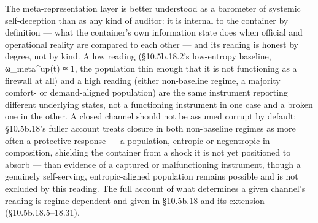 \documentclass[
]{article}
\begin{document}
The meta-representation layer is better understood as a barometer of
systemic self-deception than as any kind of auditor: it is internal to
the container by definition --- what the container's own information
state does when official and operational reality are compared to each
other --- and its reading is honest by degree, not by kind. A low
reading (§10.5b.18.2's low-entropy baseline, ω\_meta\^{}up(t) ≈ 1, the
population thin enough that it is not functioning as a firewall at all)
and a high reading (either non-baseline regime, a majority comfort- or
demand-aligned population) are the same instrument reporting different
underlying states, not a functioning instrument in one case and a broken
one in the other. A closed channel should not be assumed corrupt by
default: §10.5b.18's fuller account treats closure in both non-baseline
regimes as more often a protective response --- a population, entropic
or negentropic in composition, shielding the container from a shock it
is not yet positioned to absorb --- than evidence of a captured or
malfunctioning instrument, though a genuinely self-serving,
entropic-aligned population remains possible and is not excluded by this
reading. The full account of what determines a given channel's reading
is regime-dependent and given in §10.5b.18 and its extension
(§10.5b.18.5--18.31).
\end{document}
